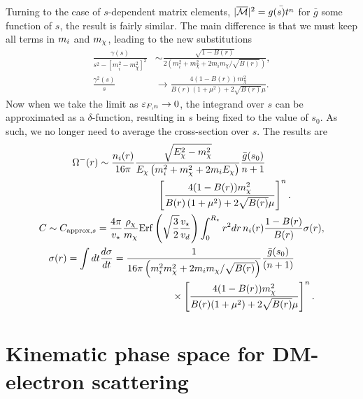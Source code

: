 Turning to the case of $s$-dependent matrix elements, $|\overline{\mathcal M}|^2 = \bar{g(s)t^n}$ for $\bar{g}$ some function of $s$, the result is fairly similar. The main difference is that we must keep all terms in $m_i$ and $m_\chi$, leading to the new substitutions
\begin{align}
    \frac{\gamma(s)}{s^2-[m_i^2-m_\chi^2]^2} 
    &\sim \frac{\sqrt{1-B(r)}}{2\left(m_i^2+m_\chi^2+2m_i m_\chi/\sqrt{B(r)}\right)},\\
    \frac{\gamma^2(s)}{s} &\rightarrow \frac{4(1-B(r))m_\chi^2}{B(r)\left(1+\mu^2\right)+2\sqrt{B(r)}\mu}. 
\end{align}
Now when we take the limit as $\varepsilon_{F,n}\rightarrow 0$, the integrand over $s$ can be approximated as a $\delta$-function, resulting in $s$ being fixed to the value of $s_0$. As such, we no longer need to average the cross-section over $s$. The results are
\begin{gather}
    \begin{split}
        \Omega^{-}(r) &\sim \frac{n_i(r)}{16\pi} \frac{\sqrt{E_\chi^2-m_\chi^2}}{E_\chi\left(m_i^2+m_\chi^2+2m_i E_\chi\right)} \frac{\bar{g}(s_0)}{n+1} \\
        & \hspace{6em}\left[\frac{4(1-B(r))m_\chi^2}{B(r)\left(1+\mu^2\right)+2\sqrt{B(r)}\mu}\right]^n.
    \end{split}\\
    C \sim C_{\mathrm{approx}, s} = \frac{4\pi}{v_\star} \frac{\rho_\chi}{m_\chi}{\rm Erf}\left(\sqrt{\frac{3}{2}}\frac{v_\star}{v_d}\right)\int_0^{R_\star}  r^2 dr \, n_i(r)  \frac{1-B(r)}{B(r)} \sigma(r)
\label{app:eq:csimplelargemtext_sdep}, \\
\begin{split}
    \sigma(r) = \int dt \frac{d\sigma}{dt} & =   \frac{1}{16\pi \left(m_i^2 m_\chi^2 + 2m_i m_\chi/\sqrt{B(r)}\right)}\frac{\bar{g}(s_0)}{(n+1)}\\
    &\hspace{6em}\times\left[\frac{4(1 - B(r)) m_\chi^2}{B(r)(1 + \mu^2) + 2\sqrt{B(r)}\mu}\right]^n.
\label{app:eq:xsecave_sdep}
\end{split}
\end{gather}



\section{Kinematic phase space for DM-electron scattering}
\label{app:sec:phasespace}

